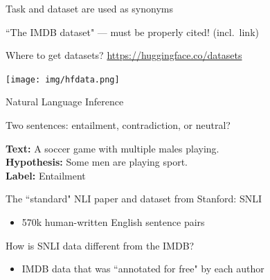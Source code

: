 \documentclass[12pt,aspectratio=169,handout]{beamer}
\begin{document}
\begin{frame}{ Task and dataset are used as synonyms}

``The IMDB dataset" --- must be properly cited! (incl.\ link)

\begin{block}{Where to get datasets?}
\url{https://huggingface.co/datasets}

\texttt{[image: img/hfdata.png]}
\end{block}

\end{frame}

\begin{frame}{Natural Language Inference}

Two sentences: entailment, contradiction, or neutral?

\begin{example}
\textbf{Text:} A soccer game with multiple males playing. \\
\textbf{Hypothesis:} Some men are playing sport. \\
\textbf{Label:} Entailment
\end{example}


The ``standard" NLI paper and dataset from Stanford: SNLI

\begin{itemize}
	\item 570k human-written English sentence pairs
\end{itemize}

How is SNLI data different from the IMDB?

\begin{itemize}
	\item IMDB data that was ``annotated for free" by each author
\end{itemize}



\end{frame}
\end{document}

